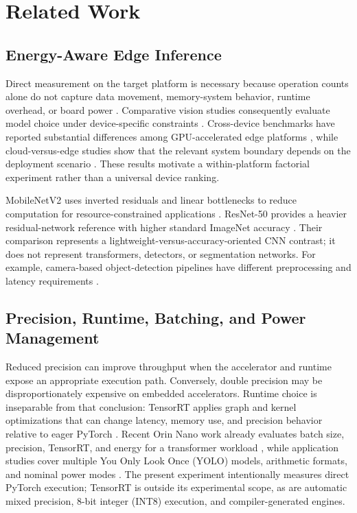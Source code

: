 \documentclass[electronics,article,submit,pdftex,moreauthors]{Definitions/mdpi}
\newcommand{\mobile}{MobileNetV2}
\newcommand{\resnet}{ResNet-50}
\begin{document}
\section{Related Work}

\subsection{Energy-Aware Edge Inference}

Direct measurement on the target platform is necessary because operation counts alone do not capture data movement, memory-system behavior, runtime overhead, or board power \cite{yang2017method}. Comparative vision studies consequently evaluate model choice under device-specific constraints \cite{mira2024benchmarking}. Cross-device benchmarks have reported substantial differences among GPU-accelerated edge platforms \cite{jo2020benchmarking,suzen2020benchmark}, while cloud-versus-edge studies show that the relevant system boundary depends on the deployment scenario \cite{koubaa2022cloud}. These results motivate a within-platform factorial experiment rather than a universal device ranking.

\mobile{} uses inverted residuals and linear bottlenecks to reduce computation for resource-constrained applications \cite{sandler2018mobilenetv2}. \resnet{} provides a heavier residual-network reference with higher standard ImageNet accuracy \cite{he2016deep}. Their comparison represents a lightweight-versus-accuracy-oriented CNN contrast; it does not represent transformers, detectors, or segmentation networks. For example, camera-based object-detection pipelines have different preprocessing and latency requirements \cite{rey2025drone}.

\subsection{Precision, Runtime, Batching, and Power Management}

Reduced precision can improve throughput when the accelerator and runtime expose an appropriate execution path. Conversely, double precision may be disproportionately expensive on embedded accelerators. Runtime choice is inseparable from that conclusion: TensorRT applies graph and kernel optimizations that can change latency, memory use, and precision behavior relative to eager PyTorch \cite{jeong2022tensorrt,nvidiatensorrt}. Recent Orin Nano work already evaluates batch size, precision, TensorRT, and energy for a transformer workload \cite{martinsalinas2025}, while application studies cover multiple You Only Look Once (YOLO) models, arithmetic formats, and nominal power modes \cite{rey2025drone,mela2025yolo}. The present experiment intentionally measures direct PyTorch execution; TensorRT is outside its experimental scope, as are automatic mixed precision, 8-bit integer (INT8) execution, and compiler-generated engines.
\end{document}
